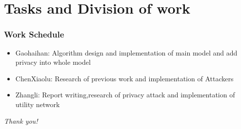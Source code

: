 \documentclass{beamer}
\begin{document}
\section{Tasks and Division of work}
\begin{frame}
  \frametitle{Work Schedule}
  \begin{itemize}
    \item Gaohaihan: Algorithm design and implementation of main model and add privacy into whole model
    \item ChenXiaolu: Research of previous work and implementation of Attackers
    \item Zhangli: Report writing,research of privacy attack and implementation of utility network
  \end{itemize}
\end{frame}

\begin{frame}{}
  \centering \Large
  \emph{Thank you!}
\end{frame}

\begin{frame}{}


  
\end{frame}
\end{document}
